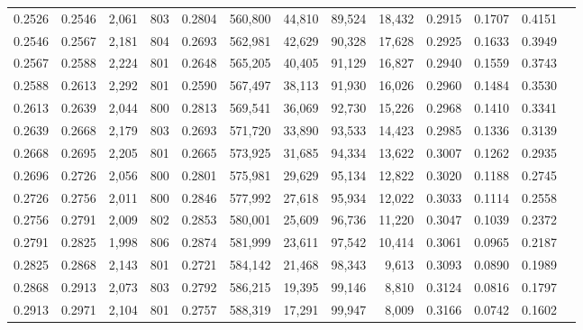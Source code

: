 \begin{tabular}{rrrrrrrrrrrrr}
0.2526 & 0.2546 &  2,061 & 803 &                                     0.2804 & 560,800 &  44,810 &  89,524 &  18,432 & 0.2915 & 0.1707 & 0.4151 \\
0.2546 & 0.2567 &  2,181 & 804 &                                     0.2693 & 562,981 &  42,629 &  90,328 &  17,628 & 0.2925 & 0.1633 & 0.3949 \\
0.2567 & 0.2588 &  2,224 & 801 &                                     0.2648 & 565,205 &  40,405 &  91,129 &  16,827 & 0.2940 & 0.1559 & 0.3743 \\
0.2588 & 0.2613 &  2,292 & 801 &                                     0.2590 & 567,497 &  38,113 &  91,930 &  16,026 & 0.2960 & 0.1484 & 0.3530 \\
0.2613 & 0.2639 &  2,044 & 800 &                                     0.2813 & 569,541 &  36,069 &  92,730 &  15,226 & 0.2968 & 0.1410 & 0.3341 \\
0.2639 & 0.2668 &  2,179 & 803 &                                     0.2693 & 571,720 &  33,890 &  93,533 &  14,423 & 0.2985 & 0.1336 & 0.3139 \\
0.2668 & 0.2695 &  2,205 & 801 &                                     0.2665 & 573,925 &  31,685 &  94,334 &  13,622 & 0.3007 & 0.1262 & 0.2935 \\
0.2696 & 0.2726 &  2,056 & 800 &                                     0.2801 & 575,981 &  29,629 &  95,134 &  12,822 & 0.3020 & 0.1188 & 0.2745 \\
0.2726 & 0.2756 &  2,011 & 800 &                                     0.2846 & 577,992 &  27,618 &  95,934 &  12,022 & 0.3033 & 0.1114 & 0.2558 \\
0.2756 & 0.2791 &  2,009 & 802 &                                     0.2853 & 580,001 &  25,609 &  96,736 &  11,220 & 0.3047 & 0.1039 & 0.2372 \\
0.2791 & 0.2825 &  1,998 & 806 &                                     0.2874 & 581,999 &  23,611 &  97,542 &  10,414 & 0.3061 & 0.0965 & 0.2187 \\
0.2825 & 0.2868 &  2,143 & 801 &                                     0.2721 & 584,142 &  21,468 &  98,343 &   9,613 & 0.3093 & 0.0890 & 0.1989 \\
0.2868 & 0.2913 &  2,073 & 803 &                                     0.2792 & 586,215 &  19,395 &  99,146 &   8,810 & 0.3124 & 0.0816 & 0.1797 \\
0.2913 & 0.2971 &  2,104 & 801 &                                     0.2757 & 588,319 &  17,291 &  99,947 &   8,009 & 0.3166 & 0.0742 & 0.1602 \\

\end{tabular}

